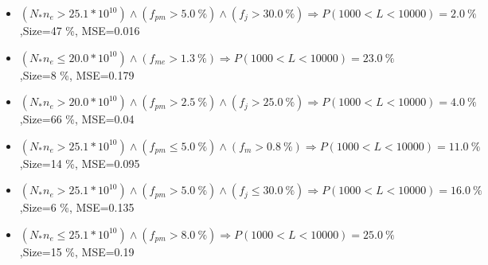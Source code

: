 \documentclass[numbered]{CSL}
\begin{document}
\begin{itemize}
\item $(N_* n_e > 25.1 * 10^{10}) \land (f_{pm} > 5.0~\%) \land (f_j > 30.0~\%) \Rightarrow P(1 000 < L < 10 000) = 2.0~\%$,\hfill Size=47 \%, MSE=0.016
\item $(N_* n_e \leq 20.0 * 10^{10}) \land (f_{me} > 1.3~\%) \Rightarrow P(1 000 < L < 10 000) = 23.0~\%$,\hfill Size=8 \%, MSE=0.179
\item $(N_* n_e > 20.0 * 10^{10}) \land (f_{pm} > 2.5~\%) \land (f_j > 25.0~\%) \Rightarrow P(1 000 < L < 10 000) = 4.0~\%$,\hfill Size=66 \%, MSE=0.04
\item $(N_* n_e > 25.1 * 10^{10}) \land (f_{pm} \leq 5.0~\%) \land (f_m > 0.8~\%) \Rightarrow P(1 000 < L < 10 000) = 11.0~\%$,\hfill Size=14 \%, MSE=0.095
\item $(N_* n_e > 25.1 * 10^{10}) \land (f_{pm} > 5.0~\%) \land (f_j \leq 30.0~\%) \Rightarrow P(1 000 < L < 10 000) = 16.0~\%$,\hfill Size=6 \%, MSE=0.135
\item $(N_* n_e \leq 25.1 * 10^{10}) \land (f_{pm} > 8.0~\%) \Rightarrow P(1 000 < L < 10 000) = 25.0~\%$,\hfill Size=15 \%, MSE=0.19
\end{itemize}
\end{document}
